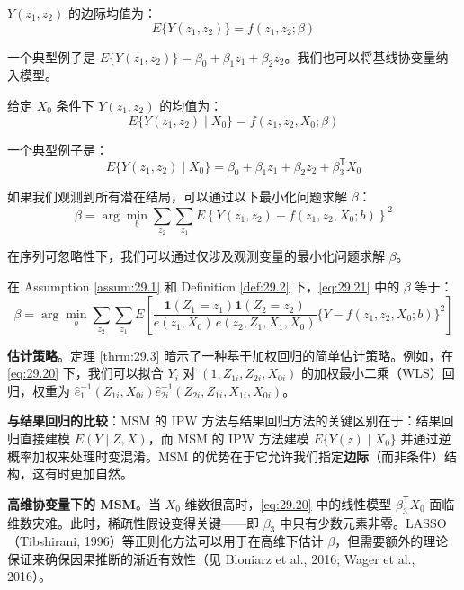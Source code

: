 \begin{Definition}\label{def:29.1}
$Y(z_1, z_2)$ 的边际均值为：
\[
E\{Y(z_1, z_2)\} = f(z_1, z_2; \beta)
\tag{29.18}
\]
\end{Definition}

一个典型例子是 $E\{Y(z_1, z_2)\} = \beta_0 + \beta_1 z_1 + \beta_2 z_2$。我们也可以将基线协变量纳入模型。

\begin{Definition}\label{def:29.2}
给定 $X_0$ 条件下 $Y(z_1, z_2)$ 的均值为：
\[
E\{Y(z_1, z_2) \mid X_0\} = f(z_1, z_2, X_0; \beta)
\tag{29.19}
\]
\end{Definition}

一个典型例子是：
\[
E\{Y(z_1, z_2) \mid X_0\} = \beta_0 + \beta_1 z_1 + \beta_2 z_2 + \beta_3^{\mathsf{T}} X_0
\label{eq:29.20}
\tag{29.20}
\]

如果我们观测到所有潜在结局，可以通过以下最小化问题求解 $\beta$：
\[
\beta = \arg\min_b \sum_{z_2} \sum_{z_1} E\left\{ Y(z_1, z_2) - f(z_1, z_2, X_0; b) \right\}^2
\label{eq:29.21}
\tag{29.21}
\]

在序列可忽略性下，我们可以通过仅涉及观测变量的最小化问题求解 $\beta$。

\begin{Theorem}\label{thrm:29.3}
在 Assumption \ref{assum:29.1} 和 Definition \ref{def:29.2} 下，\ref{eq:29.21} 中的 $\beta$ 等于：
\[
\beta = \arg\min_b \sum_{z_2} \sum_{z_1} E\left[ \frac{\mathbf{1}(Z_1 = z_1) \mathbf{1}(Z_2 = z_2)}{e(z_1, X_0) \, e(z_2, Z_1, X_1, X_0)} \{ Y - f(z_1, z_2, X_0; b) \}^2 \right]
\tag{29.22}
\]
\end{Theorem}

\textbf{估计策略}。定理 \ref{thrm:29.3} 暗示了一种基于加权回归的简单估计策略。例如，在 \ref{eq:29.20} 下，我们可以拟合 $Y_i$ 对 $(1, Z_{1i}, Z_{2i}, X_{0i})$ 的加权最小二乘（WLS）回归，权重为 $\hat{e}_1^{-1}(Z_{1i}, X_{0i}) \hat{e}_{2i}^{-1}(Z_{2i}, Z_{1i}, X_{1i}, X_{0i})$。

\textbf{与结果回归的比较}：MSM 的 IPW 方法与结果回归方法的关键区别在于：结果回归直接建模 $E(Y \mid Z, X)$，而 MSM 的 IPW 方法建模 $E\{Y(z) \mid X_0\}$ 并通过逆概率加权来处理时变混淆。MSM 的优势在于它允许我们指定\textbf{边际}（而非条件）结构，这有时更加自然。

\textbf{高维协变量下的 MSM}。当 $X_0$ 维数很高时，\ref{eq:29.20} 中的线性模型 $\beta_3^{\mathsf{T}} X_0$ 面临维数灾难。此时，稀疏性假设变得关键——即 $\beta_3$ 中只有少数元素非零。LASSO（Tibshirani, 1996）等正则化方法可以用于在高维下估计 $\beta$，但需要额外的理论保证来确保因果推断的渐近有效性（见 Bloniarz et al., 2016; Wager et al., 2016）。

